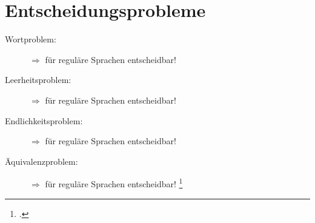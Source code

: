 \documentclass{lehramt-informatik-haupt}
\begin{document}
%

\section{Entscheidungsprobleme}

\begin{description}

\item[Wortproblem:]
$\Rightarrow$ für
reguläre Sprachen entscheidbar!

\item[Leerheitsproblem:]
$\Rightarrow$ für reguläre Sprachen entscheidbar!

\item[Endlichkeitsproblem:]
$\Rightarrow$ für reguläre Sprachen entscheidbar!

\item[Äquivalenzproblem:]

$\Rightarrow$ für reguläre Sprachen entscheidbar!
\footcite[Seite 70-71]{theo:fs:1}
\end{description}

\literatur
\end{document}
